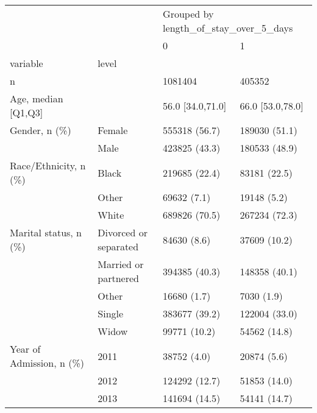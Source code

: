 \begin{tabular}{llll}
\toprule
                                       &   & \multicolumn{2}{l}{Grouped by length\_of\_stay\_over\_5\_days} \\
                                       &   &                                     0 &                 1 \\
variable & level &                                       &                   \\
\midrule
n &   &                               1081404 &            405352 \\
Age, median [Q1,Q3] &   &                      56.0 [34.0,71.0] &  66.0 [53.0,78.0] \\
Gender, n (\%) & Female &                         555318 (56.7) &     189030 (51.1) \\
                                       & Male &                         423825 (43.3) &     180533 (48.9) \\
Race/Ethnicity, n (\%) & Black &                         219685 (22.4) &      83181 (22.5) \\
                                       & Other &                           69632 (7.1) &       19148 (5.2) \\
                                       & White &                         689826 (70.5) &     267234 (72.3) \\
Marital status, n (\%) & Divorced or separated &                           84630 (8.6) &      37609 (10.2) \\
                                       & Married or partnered &                         394385 (40.3) &     148358 (40.1) \\
                                       & Other &                           16680 (1.7) &        7030 (1.9) \\
                                       & Single &                         383677 (39.2) &     122004 (33.0) \\
                                       & Widow &                          99771 (10.2) &      54562 (14.8) \\
Year of Admission, n (\%) & 2011 &                           38752 (4.0) &       20874 (5.6) \\
                                       & 2012 &                         124292 (12.7) &      51853 (14.0) \\
                                       & 2013 &                         141694 (14.5) &      54141 (14.7) \\

\end{tabular}

